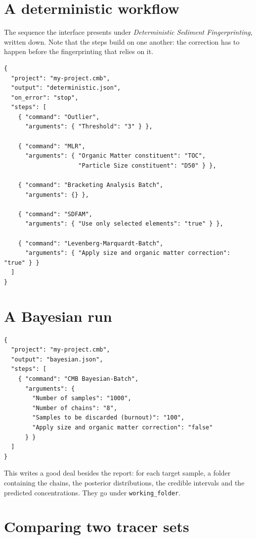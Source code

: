 \documentclass[11pt,a4paper]{report}
\begin{document}
\section{A deterministic workflow}

The sequence the interface presents under \emph{Deterministic Sediment
Fingerprinting}, written down. Note that the steps build on one another: the
correction has to happen before the fingerprinting that relies on it.

\begin{lstlisting}[language=scriptjson]
{
  "project": "my-project.cmb",
  "output": "deterministic.json",
  "on_error": "stop",
  "steps": [
    { "command": "Outlier",
      "arguments": { "Threshold": "3" } },

    { "command": "MLR",
      "arguments": { "Organic Matter constituent": "TOC",
                     "Particle Size constituent": "D50" } },

    { "command": "Bracketing Analysis Batch",
      "arguments": {} },

    { "command": "SDFAM",
      "arguments": { "Use only selected elements": "true" } },

    { "command": "Levenberg-Marquardt-Batch",
      "arguments": { "Apply size and organic matter correction": "true" } }
  ]
}
\end{lstlisting}

\section{A Bayesian run}

\begin{lstlisting}[language=scriptjson]
{
  "project": "my-project.cmb",
  "output": "bayesian.json",
  "steps": [
    { "command": "CMB Bayesian-Batch",
      "arguments": {
        "Number of samples": "1000",
        "Number of chains": "8",
        "Samples to be discarded (burnout)": "100",
        "Apply size and organic matter correction": "false"
      } }
  ]
}
\end{lstlisting}

This writes a good deal besides the report: for each target sample, a folder
containing the chains, the posterior distributions, the credible intervals and
the predicted concentrations. They go under \texttt{working\_folder}.

\section{Comparing two tracer sets}
\end{document}
